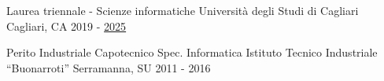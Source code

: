 

\begin{cventries}

  \cventry
    {Laurea triennale - Scienze informatiche} %
    {Università degli Studi di Cagliari} %
    {Cagliari, CA} %
    {2019 - \underline{2025}} %
    {}
    
  \cventry
    {Perito Industriale Capotecnico Spec. Informatica} %
    {Istituto Tecnico Industriale “Buonarroti”} %
    {Serramanna, SU} %
    {2011 - 2016} %
    {}
\end{cventries}
